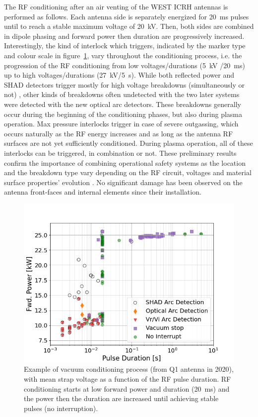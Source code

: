 \documentclass[12p]{iopart}
\begin{document}
The RF conditioning after an air venting of the WEST ICRH antennas is performed as follows. Each antenna side is separately energized for \SI{20}{\milli\second} pulses until to reach a stable maximum voltage of \SI{20}{\kilo\volt}. Then, both sides are combined in dipole phasing and forward power then duration are progressively increased. Interestingly, the kind of interlock which triggers, indicated by the marker type and colour scale in figure~\ref{fig:arcdetection}, vary throughout the conditioning process, i.e. the progression of the RF conditioning from low voltages/durations (\SI{5}{\kilo\volt} /\SI{20}{\milli\second}) up to high voltages/durations (\SI{27}{\kilo\volt}/\SI{5}{\second}). While both reflected power and SHAD detectors trigger mostly for high voltage breakdowns (simultaneously or not) \cite{dinca2011}, other kinds of breakdowns often undetected with the two later systems were detected with the new optical arc detectors. These breakdowns generally occur during the beginning of the conditioning phases, but also during plasma operation. Max pressure interlocks trigger in case of severe outgassing, which occurs naturally as the RF energy increases and as long as the antenna RF surfaces are not yet sufficiently conditioned. During plasma operation, all of these interlocks can be triggered, in combination or not. These preliminary results confirm the importance of combining operational safety systems as the location and the breakdown type vary depending on the RF circuit, voltages and material surface properties' evolution \cite{dinca2011-1}. No significant damage has been observed on the antenna front-faces and internal elements since their installation. 

\begin{figure}
	\centering
	\includegraphics[width=0.95\linewidth]{figures/arc_detection}
	\caption{Example of vacuum conditioning process (from Q1 antenna in 2020), with mean strap voltage as a function of the RF pulse duration. RF conditioning starts at low forward power and duration (\SI{20}{\milli\second}) and the power then the duration are increased until achieving stable pulses (no interruption).}
	\label{fig:arcdetection}
\end{figure}
\end{document}
